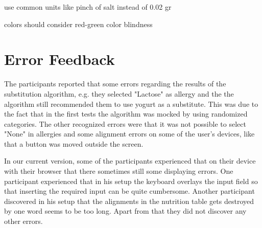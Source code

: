 use common units like pinch of salt instead of 0.02 gr
        
        colors should consider red-green color blindness

\section{Error Feedback}


The participants reported that some errors regarding the results of the substitution algorithm, e.g. they selected "Lactose" as allergy and the the algorithm still recommended them to use yogurt as a substitute. This was due to the fact that in the first tests the algorithm was mocked by using randomized categories. The other recognized errors were that it was not possible to select "None" in allergies and some alignment errors on some of the user's devices, like that a button was moved outside the screen.


In our current version, some of the participants experienced that on their  device with their browser that there sometimes still some displaying errors. One participant experienced that in his setup the keyboard overlays the input field so that inserting the required input can be quite cumbersome. Another participant discovered in his setup that the alignments in the nutrition table gets destroyed by one word seems to be too long. Apart from that they did not discover any other errors.


